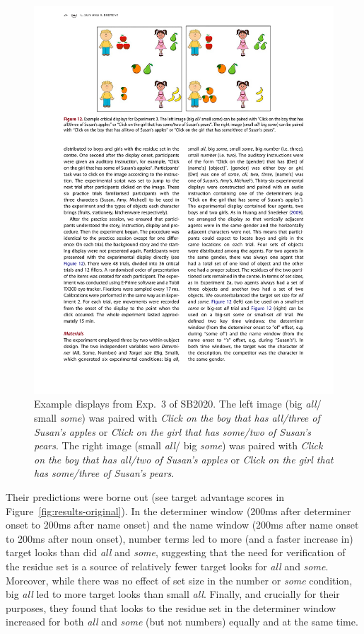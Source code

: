 \documentclass[10pt,letterpaper]{article}
\newcommand{\figref}[1]{Figure~\ref{#1}}
\newcommand{\expref}[1]{Exp.~#1}
\begin{document}
\begin{figure}[H]
\centering
\includegraphics[width=\columnwidth]{images/display}
\caption{Example displays from \expref{3} of SB2020. The left image (big \emph{all}/ small  \emph{some}) was paired with  \emph{Click on the boy that has all/three of Susan's apples} or  \emph{Click on the girl that has some/two of Susan's pears}. The right image (small  \emph{all}/ big  \emph{some}) was paired with  \emph{Click on the boy that has all/two of Susan's apples} or  \emph{Click on the girl that has some/three of Susan's pears}.} 
\label{fig:display}
\end{figure}

Their predictions were borne out (see target advantage scores in  \figref{fig:results-original}). In the determiner window (200ms after determiner onset to 200ms after name onset) and the name window (200ms after name onset to 200ms after noun onset), number terms led to more (and a faster increase in) target looks than did \emph{all} and \emph{some}, suggesting that the need for verification of the residue set is a source of relatively fewer target looks for \emph{all} and \emph{some}. Moreover, while there was no effect of set size in the number or \emph{some} condition, big \emph{all} led to more target looks than small \emph{all}. Finally, and crucially for their purposes, they found that looks to the residue set in the determiner window increased for both \emph{all} and \emph{some} (but not numbers) equally and at the same time. 
\end{document}

